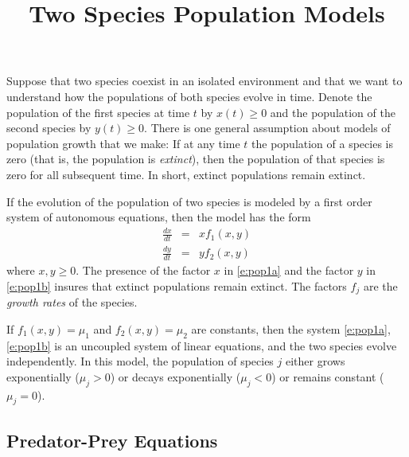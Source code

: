 \documentclass{ximera}
\title{Two Species Population Models}
\begin{document}
\begin{abstract}
\end{abstract}
\maketitle


\label{S:TSPM} 

Suppose that two species coexist in an isolated environment and
that we want to understand how the populations of both species
evolve in time.  Denote the population of the first species at time 
$t$ by $x(t)\ge 0$ and the population of the second species
by $y(t)\ge 0$.  There is one general assumption about models of
population growth that we make: If at any time $t$ the
population of a species is zero (that is, the population is {\em
extinct\/}), then the population of that species is zero for all
subsequent time.  In short, extinct populations remain extinct.

If the evolution of the population of two species is modeled by a
first order system of autonomous equations, then the model has the form
\begin{eqnarray}
\frac{dx}{dt} & = & xf_1(x,y) \label{e:pop1a} \\
\frac{dy}{dt} & = & yf_2(x,y) \label{e:pop1b}
\end{eqnarray}  
where $x,y \ge 0$.
The presence of the factor $x$ in \eqref{e:pop1a} and the factor
$y$ in \eqref{e:pop1b} insures that extinct populations remain
extinct. The factors $f_j$ are the {\em growth rates\/} of the 
species.

If $f_1(x,y) = \mu_1$ and $f_2(x,y)=\mu_2$ are constants, then 
the system \eqref{e:pop1a},\eqref{e:pop1b} is an uncoupled system 
of linear equations, and the two species evolve independently.  
In this model, the population of species $j$ either grows
exponentially ($\mu_j>0$) or decays exponentially ($\mu_j<0$)
or remains constant ($\mu_j=0$).


\subsection*{Predator-Prey Equations}
\end{document}
